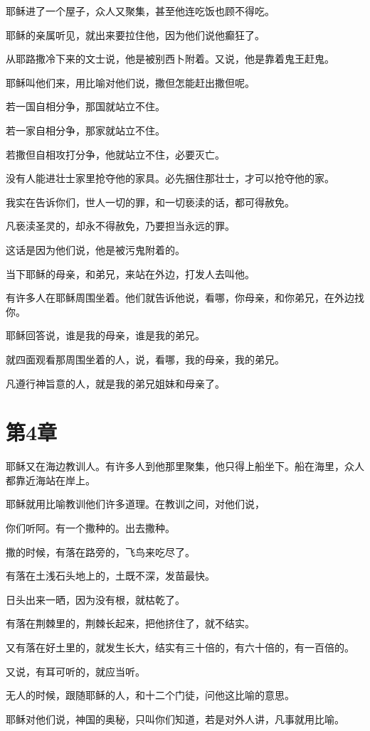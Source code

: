 \documentclass[12pt,oneside]{book}
\begin{document}
耶稣进了一个屋子，众人又聚集，甚至他连吃饭也顾不得吃。

耶稣的亲属听见，就出来要拉住他，因为他们说他癫狂了。

从耶路撒冷下来的文士说，他是被别西卜附着。又说，他是靠着鬼王赶鬼。

耶稣叫他们来，用比喻对他们说，撒但怎能赶出撒但呢。

若一国自相分争，那国就站立不住。

若一家自相分争，那家就站立不住。

若撒但自相攻打分争，他就站立不住，必要灭亡。

没有人能进壮士家里抢夺他的家具。必先捆住那壮士，才可以抢夺他的家。

我实在告诉你们，世人一切的罪，和一切亵渎的话，都可得赦免。

凡亵渎圣灵的，却永不得赦免，乃要担当永远的罪。

这话是因为他们说，他是被污鬼附着的。

当下耶稣的母亲，和弟兄，来站在外边，打发人去叫他。

有许多人在耶稣周围坐着。他们就告诉他说，看哪，你母亲，和你弟兄，在外边找你。

耶稣回答说，谁是我的母亲，谁是我的弟兄。

就四面观看那周围坐着的人，说，看哪，我的母亲，我的弟兄。

凡遵行神旨意的人，就是我的弟兄姐妹和母亲了。

\chapter{第4章}
耶稣又在海边教训人。有许多人到他那里聚集，他只得上船坐下。船在海里，众人都靠近海站在岸上。

耶稣就用比喻教训他们许多道理。在教训之间，对他们说，

你们听阿。有一个撒种的。出去撒种。

撒的时候，有落在路旁的，飞鸟来吃尽了。

有落在土浅石头地上的，土既不深，发苗最快。

日头出来一晒，因为没有根，就枯乾了。

有落在荆棘里的，荆棘长起来，把他挤住了，就不结实。

又有落在好土里的，就发生长大，结实有三十倍的，有六十倍的，有一百倍的。

又说，有耳可听的，就应当听。

无人的时候，跟随耶稣的人，和十二个门徒，问他这比喻的意思。

耶稣对他们说，神国的奥秘，只叫你们知道，若是对外人讲，凡事就用比喻。
\end{document}
